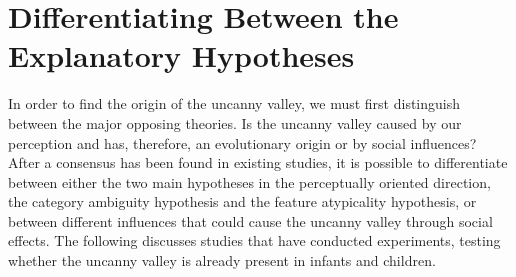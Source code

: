 \section{Differentiating Between the Explanatory Hypotheses}
In order to find the origin of the uncanny valley, we must first distinguish between the major opposing theories. Is the uncanny valley caused by our perception and has, therefore, an evolutionary origin or by social influences? After a consensus has been found in existing studies, it is possible to differentiate between either the two main hypotheses in the perceptually oriented direction, the category ambiguity hypothesis and the feature atypicality hypothesis, or between different influences that could cause the uncanny valley through social effects. The following discusses studies that have conducted experiments, testing whether the uncanny valley is already present in infants and children.
